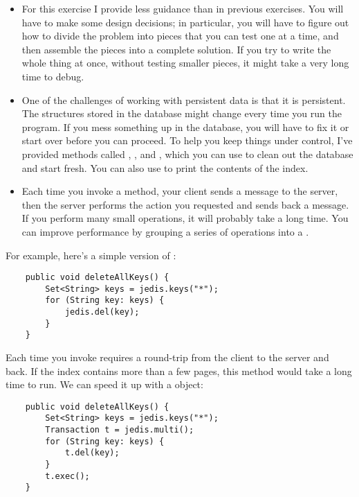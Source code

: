 \documentclass[12pt]{book}
\theoremstyle{exercise}
\begin{document}
\begin{itemize}

\item
  For this exercise I provide less guidance than in previous
  exercises.  You will have to make some design decisions; in
  particular, you will have to figure out how to divide the problem
  into pieces that you can test one at a time, and then assemble the
  pieces into a complete solution. If you try to write the whole thing
  at once, without testing smaller pieces, it might take a very long
  time to debug.

\item
  One of the challenges of working with persistent data is that it is
  persistent. The structures stored in the database might change every
  time you run the program. If you mess something up in the database,
  you will have to fix it or start over before you can proceed. To help
  you keep things under control, I've provided methods called
  , , and
  , which you can use to clean out the database
  and start fresh. You can also use  to print the
  contents of the index.

\item
  Each time you invoke a  method, your client sends a
  message to the server, then the server performs the action you
  requested and sends back a message. If you perform many small
  operations, it will probably take a long time. You can improve
  performance by grouping a series of operations into a
  .

\end{itemize}

For example, here's a simple version of :

\begin{verbatim}
    public void deleteAllKeys() {
        Set<String> keys = jedis.keys("*");
        for (String key: keys) {
            jedis.del(key);
        }
    }
\end{verbatim}

Each time you invoke  requires a round-trip from the client
to the server and back. If the index contains more than a few pages,
this method would take a long time to run. We can speed it up with a
 object:


\begin{verbatim}
    public void deleteAllKeys() {
        Set<String> keys = jedis.keys("*");
        Transaction t = jedis.multi();
        for (String key: keys) {
            t.del(key);
        }
        t.exec();
    }
\end{verbatim}
\end{document}
